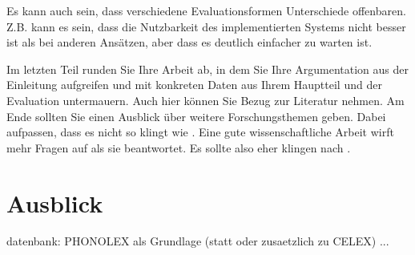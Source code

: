 Es kann auch sein, dass verschiedene Evaluationsformen Unterschiede offenbaren. Z.B. kann es sein, dass die Nutzbarkeit des implementierten Systems nicht besser ist als bei anderen Ansätzen, aber dass es deutlich einfacher zu warten ist.


Im letzten Teil runden Sie Ihre Arbeit ab, in dem Sie Ihre Argumentation aus der Einleitung aufgreifen und mit konkreten Daten aus Ihrem Hauptteil und der Evaluation untermauern. Auch hier können Sie Bezug zur Literatur nehmen. Am Ende sollten Sie einen Ausblick über weitere Forschungsthemen geben. Dabei aufpassen, dass es nicht so klingt wie . Eine gute wissenschaftliche Arbeit wirft mehr Fragen auf als sie beantwortet. Es sollte also eher klingen nach .

\section{Ausblick}

datenbank: PHONOLEX als Grundlage (statt oder zusaetzlich zu CELEX)
...